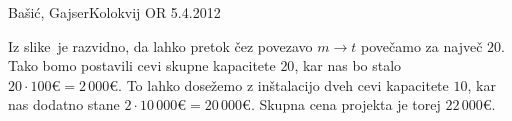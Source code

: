 \begin{naloga}{Bašić, Gajser}{Kolokvij OR 5.4.2012}
\begin{odgovor}
\begin{enumerate}[(a)]
Iz slike~ je razvidno,
da lahko pretok čez povezavo $m \to t$ povečamo za največ $20$.
Tako bomo postavili cevi skupne kapacitete $20$,
kar nas bo stalo $20 \cdot 100 € = 2\,000 €$.
To lahko dosežemo z inštalacijo dveh cevi kapacitete $10$,
kar nas dodatno stane $2 \cdot 10\,000 € = 20\,000 €$.
Skupna cena projekta je torej $22\,000 €$.
\end{enumerate}

\begin{slika}
\end{slika}
\begin{slika}
\end{slika}
\end{odgovor}
\end{naloga}
